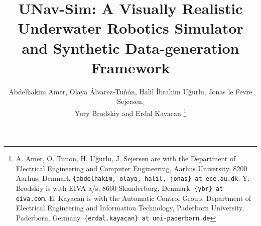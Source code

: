 \documentclass[letterpaper, 10 pt, conference]{ieeeconf}  %
\title{\LARGE \bf
UNav-Sim: A Visually Realistic Underwater Robotics Simulator and Synthetic Data-generation Framework
}
\author{ 
Abdelhakim Amer\orcidA{}, Olaya Álvarez-Tuñón\orcidB{}, Halil \.{I}brahim U\u{g}urlu\orcidC{}, Jonas le Fevre Sejersen\orcidD{}, \\ Yury Brodskiy\orcidE{} and
Erdal Kayacan\orcidF{}%
\thanks{A. Amer, O. Tunon, H. U\u{g}urlu, J. Sejersen  are with the Department of Electrical Engineering and Computer Engineering, Aarhus University, 8200 Aarhus, Denmark {\tt\small \{abdelhakim, olaya, halil, jonas\} at ece.au.dk}.
Y. Brodskiy is with EIVA a/s, 8660 Skanderborg, Denmark. {\tt\small \{ybr\} at eiva.com}.
E. Kayacan is with the Automatic Control Group, Department of Electrical Engineering and Information Technology, Paderborn University, Paderborn, Germany. {\tt\small \{erdal.kayacan\} at uni-paderborn.de}}
}
\begin{document}
\maketitle
\thispagestyle{empty}
\pagestyle{empty}


\begin{abstract}




\end{abstract}
\end{document}
